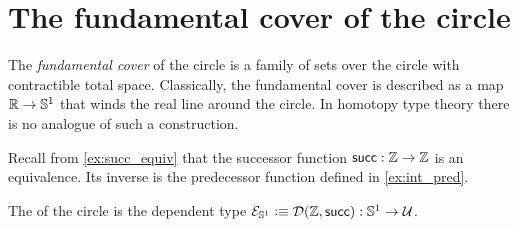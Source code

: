 \begin{comment}
\begin{defn}\label{defn:fiber_sequence}
A \define{fiber sequence} 
\begin{equation*}
F \hookrightarrow E \twoheadrightarrow B
\end{equation*}
consists of a \define{base type} $B$ with a base point $b_0$ and a dependent type $P:B\to\type$, a type $F$ called the \define{fiber} with an equivalence $\eqv{P(b_0)}{F}$, and a type $E$ called the \define{total space} with a map $p:E\to B$ and an equivalence $e:\eqv{(\sm{b:B}P(b))}{E}$ such that the triangle
\begin{equation*}
\begin{tikzcd}
\Big(\sm{b:B}P(b)\Big) \arrow[rr,"e"] \arrow[dr,swap,"\proj 1"] & & E \arrow[dl,"p"] \\
& B
\end{tikzcd}
\end{equation*}
commutes.
\end{defn}
\end{comment}

\section{The fundamental cover of the circle}

The \emph{fundamental cover} of the circle is a family of sets over the circle with contractible total space.
Classically, the fundamental cover is described as a map $\mathbb{R}\to\mathbb{S}^{1}$ that winds the real line around the circle.
In homotopy type theory there is no analogue of such a construction.

Recall from \cref{ex:succ_equiv} that the successor function $\mathsf{succ}:\mathbb{Z}\to \mathbb{Z}$ is an equivalence. Its inverse is the predecessor function defined in \cref{ex:int_pred}. 

\begin{defn}
The  of the circle is the dependent type $\mathcal{E}_{\mathbb{S}^{1}}\vcentcolon\equiv\mathcal{D}(\mathbb{Z},\mathsf{succ}):\mathbb{S}^{1}\to\mathcal{U}$.
\end{defn}

